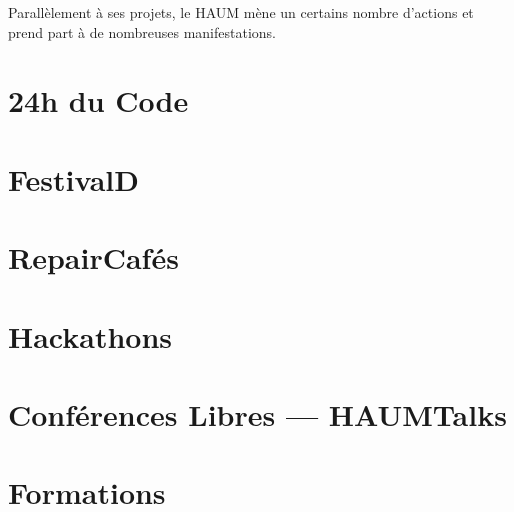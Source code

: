 Parallèlement à ses projets, le HAUM mène un certains nombre d'actions et prend part à de nombreuses manifestations.

\section{24h du Code}

\section{FestivalD}

\section{RepairCafés}

\section{Hackathons}

\section{Conférences Libres --- HAUMTalks}

\section{Formations}
